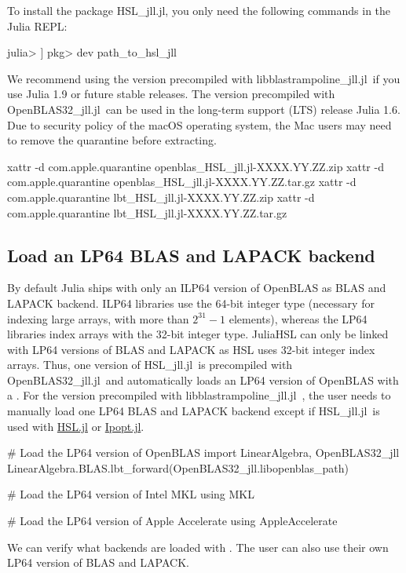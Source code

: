 \documentclass[gdweb]{geradwp}
\newcommand{\JuliaHSL}{JuliaHSL\xspace}  %
\newcommand{\HSLjll}{HSL\_jll.jl}
\newcommand{\LBTjll}{libblastrampoline\_jll.jl}
\newcommand{\OpenBLASjll}{OpenBLAS32\_jll.jl}
\begin{document}
To install the package \HSLjll, you only need the following commands in the Julia REPL:
\begin{jllisting}
julia> ]
pkg> dev path_to_hsl_jll
\end{jllisting}
We recommend using the version precompiled with \LBTjll~if you use Julia 1.9 or future stable releases.
The version precompiled with \OpenBLASjll~can be used in the long-term support (LTS) release Julia 1.6.
Due to security policy of the macOS operating system, the Mac users may need to remove the quarantine before extracting.
\begin{jllisting}
xattr -d com.apple.quarantine openblas_HSL_jll.jl-XXXX.YY.ZZ.zip
xattr -d com.apple.quarantine openblas_HSL_jll.jl-XXXX.YY.ZZ.tar.gz
xattr -d com.apple.quarantine lbt_HSL_jll.jl-XXXX.YY.ZZ.zip
xattr -d com.apple.quarantine lbt_HSL_jll.jl-XXXX.YY.ZZ.tar.gz
\end{jllisting}

\subsection{Load an LP64 BLAS and LAPACK backend}

By default Julia ships with only an ILP64 version of OpenBLAS as BLAS and LAPACK backend.
ILP64 libraries use the 64-bit integer type (necessary for indexing large arrays, with more than $2^{31}-1$ elements), whereas the LP64 libraries index arrays with the 32-bit integer type.
\JuliaHSL can only be linked with LP64 versions of BLAS and LAPACK as HSL uses 32-bit integer index arrays.
Thus, one version of \HSLjll~is precompiled with \OpenBLASjll~and automatically loads an LP64 version of OpenBLAS with a .
For the version precompiled with \LBTjll~, the user needs to manually load one LP64 BLAS and LAPACK backend except if \HSLjll~is used with \href{https://github.com/JuliaSmoothOptimizers/HSL.jl}{HSL.jl} or \href{https://github.com/jump-dev/Ipopt.jl}{Ipopt.jl}.
\begin{jllisting}
# Load the LP64 version of OpenBLAS
import LinearAlgebra, OpenBLAS32_jll
LinearAlgebra.BLAS.lbt_forward(OpenBLAS32_jll.libopenblas_path)

# Load the LP64 version of Intel MKL
using MKL

# Load the LP64 version of Apple Accelerate
using AppleAccelerate
\end{jllisting}
We can verify what backends are loaded with .
The user can also use their own LP64 version of BLAS and LAPACK.
\end{document}

